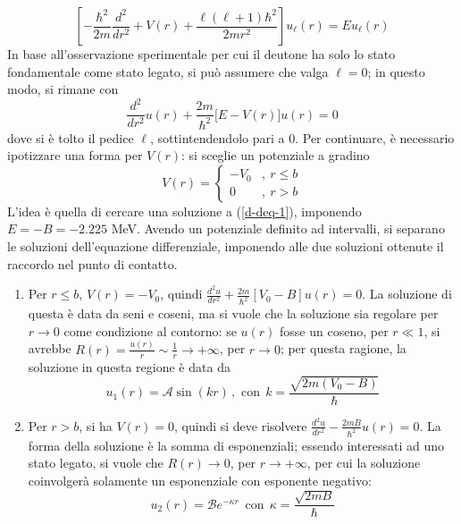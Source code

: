\documentclass[11pt, a4paper]{scrartcl}
\theoremstyle{style}
\numberwithin{equation}{subsection}
\begin{document}
\begin{equation}
	\left[ - \frac{\hbar ^2}{2m}\frac{d ^2}{d r^2} + V(r) + \frac{\ell (\ell +1)\hbar ^2}{2mr^2} \right] u_\ell (r) = Eu_\ell (r)
\end{equation}
In base all'osservazione sperimentale per cui il deutone ha solo lo stato fondamentale come stato legato, si pu\`o assumere che valga $\ell =0$; in questo modo, si rimane con
\begin{equation}\label{d-deq-1}
	\frac{d ^2}{d r^2} u(r) + \frac{2m}{\hbar ^2}\big[ E-V(r) \big] u(r)= 0 
\end{equation}
dove si \`e tolto il pedice $\ell $, sottintendendolo pari a $0$.
Per continuare, \`e necessario ipotizzare una forma per $V(r)$: si sceglie un potenziale a gradino
\[
V(r) = \begin{cases}
	 - V_0 &,\ r\le b\\
	 0 &,\ r > b
\end{cases}
\] 
L'idea \`e quella di cercare una soluzione a (\ref{d-deq-1}), imponendo $E = - B = - 2.225$ MeV.
Avendo un potenziale definito ad intervalli, si separano le soluzioni dell'equazione differenziale, imponendo alle due soluzioni ottenute il raccordo nel punto di contatto. 
\begin{enumerate}[(1).]
	\item Per $r\le b$, $V(r) = -V_0$, quindi $\frac{d ^2 u}{d r^2}  + \frac{2m}{\hbar ^2}\left[ V_0-B \right] u(r) = 0 $. 
		La soluzione di questa \`e data da seni e coseni, ma si vuole che la soluzione sia regolare per $r\to 0$ come condizione al contorno: se $u(r)$ fosse un coseno, per $r\ll 1$, si avrebbe $R(r) = \frac{u(r)}{r} \sim \frac{1}{r} \to  +\infty$, per $r\to 0$; per questa ragione, la soluzione in questa regione \`e data da 
		\begin{equation}
			u_1(r) = \mathcal{A}  \sin(kr) \, , \text{ con} \ \ k = \frac{\sqrt{2m(V_0-B)} }{\hbar }
		\end{equation}
	\item Per $r>b$, si ha $V(r) = 0$, quindi si deve risolvere $\frac{d ^2u}{d r^2} - \frac{2mB}{\hbar ^2}u(r) = 0 $. 
		La forma della soluzione \`e la somma di esponenziali; essendo interessati ad uno stato legato, si vuole che $R(r) \to 0$, per $r\to +\infty$, per cui la soluzione coinvolger\`a solamente un esponenziale con esponente negativo:
		\begin{equation}
			u_2(r) = \mathcal{B} e^{-\kappa r} \, \text{ con} \ \ \kappa  = \frac{\sqrt{2mB} }{\hbar }
		\end{equation}
\end{enumerate}
\end{document}
